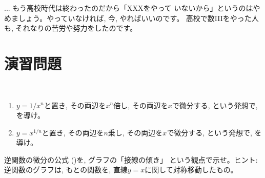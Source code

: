 


\begin{faq}\small{
... もう高校時代は終わったのだから「XXXをやって
いないから」というのはやめましょう。やっていなければ, 今, やればいいのです。
高校で数IIIをやった人も, それなりの苦労や努力をしたのです。}\end{faq}
\hv



\section*{演習問題}


\begin{exq}　
\begin{enumerate}
\item $y=1/x^n$と置き, その両辺を$x^n$倍し, その両辺を$x$で微分する, 
という発想で, を導け。
\item $y=x^{1/n}$と置き, その両辺を$n$乗し, その両辺を$x$で微分する, 
という発想で, を導け。
\end{enumerate}
\end{exq}

\begin{exq} 逆関数の微分の公式 ()を, グラフの「接線の傾き」
という観点で示せ。ヒント: 逆関数のグラフは, もとの関数を, 
直線$y=x$に関して対称移動したもの。\end{exq}

